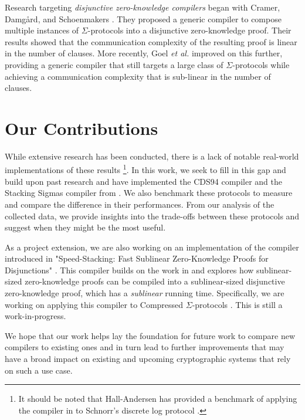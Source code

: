 Research targeting \textit{disjunctive zero-knowledge compilers} began with Cramer, Damg{\aa}rd, and Schoenmakers \cite{CDS94}. 
They proposed a generic compiler to compose multiple instances of $\Sigma$-protocols into a disjunctive zero-knowledge proof. 
Their results showed that the communication complexity of the resulting proof is linear in the number of clauses.
More recently, Goel {\em et al.} \cite{StackingSigmas} improved on this further, providing a generic compiler that still targets 
a large class of $\Sigma$-protocols while achieving a communication complexity that is sub-linear in the number of clauses.

\section{Our Contributions}

While extensive research has been conducted, there is a lack of notable real-world implementations 
of these results
\footnote{It should be noted that Hall-Andersen \cite{MHAStackSig} has provided a benchmark of applying the compiler in 
\cite{StackingSigmas} to Schnorr's discrete log protocol \cite{Schnorr}.}. 
In this work, we seek to fill in this gap and build upon past research and have implemented
the CDS94 compiler \cite{CDS94} and the Stacking Sigmas compiler from \cite{StackingSigmas}. 
We also benchmark these protocols to measure and compare the difference in their performances. 
From our analysis of the collected data, we provide insights into the trade-offs between these 
protocols and suggest when they might be the most useful. 

As a project extension, we are also working on an implementation of the compiler 
introduced in "Speed-Stacking: Fast Sublinear Zero-Knowledge Proofs for Disjunctions" 
\cite{SpeedStacking}. This compiler builds on the work in \cite{StackingSigmas} and 
explores how sublinear-sized zero-knowledge proofs can be compiled into a 
sublinear-sized disjunctive zero-knowledge proof, which has a \textit{sublinear} 
running time. Specifically, we are working on applying this compiler to Compressed 
$\Sigma$-protocols \cite{attema}. This is still a work-in-progress.

We hope that our work helps lay the foundation for future work to compare 
new compilers to existing ones and in turn lead to further improvements 
that may have a broad impact on existing and upcoming cryptographic systems that rely on such a use case. 

